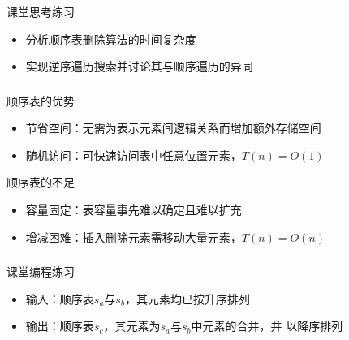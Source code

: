\begin{frame}
    \frametitle{\insertsubsectionhead}
    \begin{alertblock}{课堂思考练习}
        \begin{itemize}
            \item<2-> 分析顺序表删除算法的时间复杂度
            \item<3-> 实现逆序遍历搜索并讨论其与顺序遍历的异同
        \end{itemize}
    \end{alertblock}
\end{frame}

\begin{frame}
    \frametitle{\insertsubsectionhead}
    \begin{block}{顺序表的优势}
        \begin{itemize}
            \item 节省空间：无需为表示元素间逻辑关系而增加额外存储空间
            \item 随机访问：可快速访问表中任意位置元素，$T(n) = O(1)$
        \end{itemize}
    \end{block}
    \pause
    \begin{block}{顺序表的不足}
        \begin{itemize}
            \item 容量固定：表容量事先难以确定且难以扩充
            \item 增减困难：插入删除元素需移动大量元素，$T(n) = O(n)$
        \end{itemize}
    \end{block}
\end{frame}

\begin{frame}
    \frametitle{\insertsubsectionhead}
    \begin{alertblock}{课堂编程练习}
        \begin{itemize}
            \item 输入：顺序表$s_{a}$与$s_{b}$，其元素均已按\alert{升序}排列
            \item 输出：顺序表$s_{c}$，其元素为$s_{a}$与$s_{b}$中元素的合并，并
                  以\alert{降序}排列
        \end{itemize}
    \end{alertblock}
\end{frame}